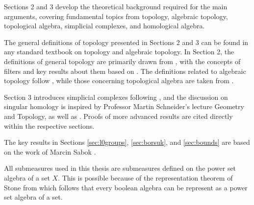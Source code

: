 Sections 2 and 3 develop the theoretical background required for the main arguments, covering fundamental topics from topology, algebraic topology, topological algebra, simplicial complexes, and homological algebra.

The general definitions of topology presented in Sections 2 and 3 can be found in any standard textbook on topology and algebraic topology. In Section 2, the definitions of general topology are primarily drawn from \cite{MunTop}, with the concepts of filters and key results about them based on \cite{BvQMT}. The definitions related to algebraic topology follow \cite{MunAlTop}, while those concerning topological algebra are taken from \cite{atop2008}.

Section 3 introduces simplicial complexes following \cite{MunAlTop}, and the discussion on singular homology is inspired by Professor Martin Schneider’s lecture Geometry and Topology, as well as \cite{hatcher}. Proofs of more advanced results are cited directly within the respective sections.

The key results in Sections \ref{sec:l0groups}, \ref{sec:borsuk}, and \ref{sec:bounds} are based on the work of Marcin Sabok \cite{sabok2012}.

All submeasures used in this thesis are submeasures defined on the power set algebra of a set $X$. This is possible because of the representation theorem of Stone from which follows that every boolean algebra can be represent as a power set algebra of a set.
